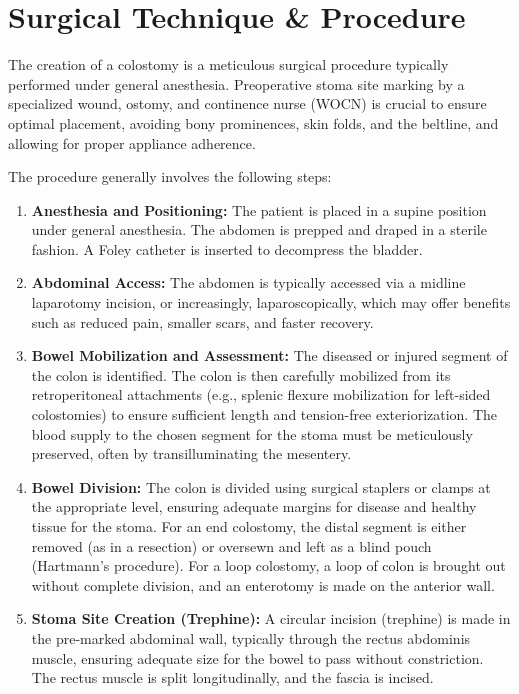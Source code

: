\section*{Surgical Technique \& Procedure}
The creation of a colostomy is a meticulous surgical procedure typically performed under general anesthesia. Preoperative stoma site marking by a specialized wound, ostomy, and continence nurse (WOCN) is crucial to ensure optimal placement, avoiding bony prominences, skin folds, and the beltline, and allowing for proper appliance adherence.

The procedure generally involves the following steps:

\begin{enumerate}
  \item \textbf{Anesthesia and Positioning:} The patient is placed in a supine position under general anesthesia. The abdomen is prepped and draped in a sterile fashion. A Foley catheter is inserted to decompress the bladder.
  
  \item \textbf{Abdominal Access:} The abdomen is typically accessed via a midline laparotomy incision, or increasingly, laparoscopically, which may offer benefits such as reduced pain, smaller scars, and faster recovery.
  
  \item \textbf{Bowel Mobilization and Assessment:} The diseased or injured segment of the colon is identified. The colon is then carefully mobilized from its retroperitoneal attachments (e.g., splenic flexure mobilization for left-sided colostomies) to ensure sufficient length and tension-free exteriorization. The blood supply to the chosen segment for the stoma must be meticulously preserved, often by transilluminating the mesentery.
  
  \item \textbf{Bowel Division:} The colon is divided using surgical staplers or clamps at the appropriate level, ensuring adequate margins for disease and healthy tissue for the stoma. For an end colostomy, the distal segment is either removed (as in a resection) or oversewn and left as a blind pouch (Hartmann's procedure). For a loop colostomy, a loop of colon is brought out without complete division, and an enterotomy is made on the anterior wall.
  
  \item \textbf{Stoma Site Creation (Trephine):} A circular incision (trephine) is made in the pre-marked abdominal wall, typically through the rectus abdominis muscle, ensuring adequate size for the bowel to pass without constriction. The rectus muscle is split longitudinally, and the fascia is incised.
  

\end{enumerate}
